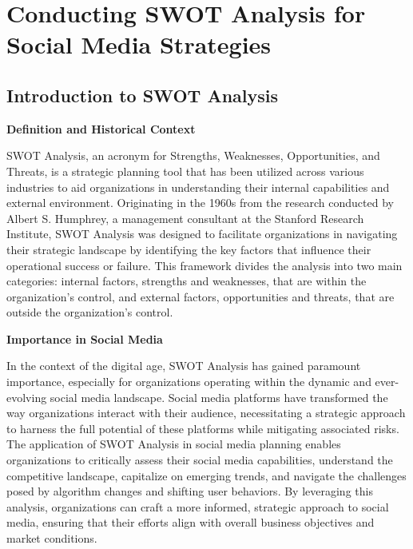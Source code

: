 \documentclass[
]{book}
\begin{document}
\hypertarget{conducting-swot-analysis-for-social-media-strategies}{%
\section*{Conducting SWOT Analysis for Social Media Strategies}\label{conducting-swot-analysis-for-social-media-strategies}}

\hypertarget{introduction-to-swot-analysis}{%
\subsection*{Introduction to SWOT Analysis}\label{introduction-to-swot-analysis}}

\textbf{Definition and Historical Context}

SWOT Analysis, an acronym for Strengths, Weaknesses, Opportunities, and Threats, is a strategic planning tool that has been utilized across various industries to aid organizations in understanding their internal capabilities and external environment. Originating in the 1960s from the research conducted by Albert S. Humphrey, a management consultant at the Stanford Research Institute, SWOT Analysis was designed to facilitate organizations in navigating their strategic landscape by identifying the key factors that influence their operational success or failure. This framework divides the analysis into two main categories: internal factors, strengths and weaknesses, that are within the organization's control, and external factors, opportunities and threats, that are outside the organization's control.

\textbf{Importance in Social Media}

In the context of the digital age, SWOT Analysis has gained paramount importance, especially for organizations operating within the dynamic and ever-evolving social media landscape. Social media platforms have transformed the way organizations interact with their audience, necessitating a strategic approach to harness the full potential of these platforms while mitigating associated risks. The application of SWOT Analysis in social media planning enables organizations to critically assess their social media capabilities, understand the competitive landscape, capitalize on emerging trends, and navigate the challenges posed by algorithm changes and shifting user behaviors. By leveraging this analysis, organizations can craft a more informed, strategic approach to social media, ensuring that their efforts align with overall business objectives and market conditions.
\end{document}
